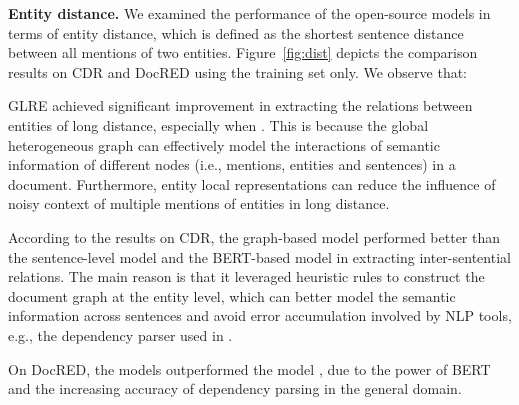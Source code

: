 \documentclass[11pt,a4paper]{article}
\begin{document}
\noindent\textbf{Entity distance.} We examined the performance of the open-source models in terms of entity distance, which is defined as the shortest sentence distance between all mentions of two entities. Figure~\ref{fig:dist} depicts the comparison results on CDR and DocRED using the training set only. We observe that:
\begin{compactenum}[(1)]
\item GLRE achieved significant improvement in extracting the relations between entities of long distance, especially when . This is because the global heterogeneous graph can effectively model the interactions of semantic information of different nodes (i.e., mentions, entities and sentences) in a document. Furthermore, entity local representations can reduce the influence of noisy context of multiple mentions of entities in long distance.

\item According to the results on CDR, the graph-based model \cite{christopoulou2019connecting} performed better than the sentence-level model \cite{zhang2018graph} and the BERT-based model \cite{wang2019fine} in extracting inter-sentential relations. The main reason is that it leveraged heuristic rules to construct the document graph at the entity level, which can better model the semantic information across sentences and avoid error accumulation involved by NLP tools, e.g., the dependency parser used in \citet{zhang2018graph}.

\item On DocRED, the models \cite{wang2019fine,zhang2018graph} outperformed the model \cite{christopoulou2019connecting}, due to the power of BERT and the increasing accuracy of dependency parsing in the general domain.
\end{compactenum}
\end{document}
